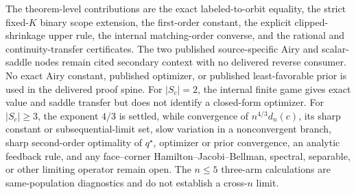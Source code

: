 The theorem-level contributions are the exact labeled-to-orbit equality, the strict fixed-\(K\) binary scope extension, the first-order constant, the explicit clipped-shrinkage upper rule, the internal matching-order converse, and the rational and continuity-transfer certificates. The two published source-specific Airy and scalar-saddle nodes remain cited secondary context with no delivered reverse consumer. No exact Airy constant, published optimizer, or published least-favorable prior is used in the delivered proof spine. For \(|S_c|=2\), the internal finite game gives exact value and saddle transfer but does not identify a closed-form optimizer. For \(|S_c|\geq3\), the exponent \(4/3\) is settled, while convergence of \(n^{4/3}d_n(c)\), its sharp constant or subsequential-limit set, slow variation in a nonconvergent branch, sharp second-order optimality of \(q^\star\), optimizer or prior convergence, an analytic feedback rule, and any face--corner Hamilton--Jacobi--Bellman, spectral, separable, or other limiting operator remain open. The \(n\leq5\) three-arm calculations are same-population diagnostics and do not establish a cross-\(n\) limit.